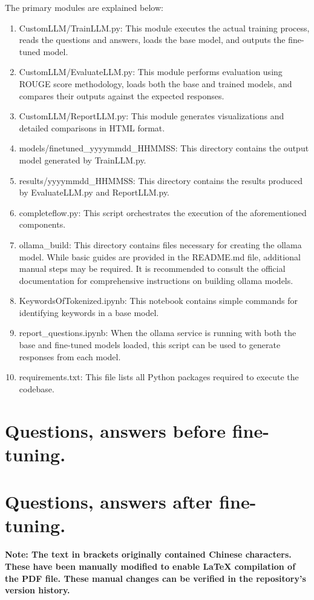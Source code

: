 \documentclass{cpsc202}
\begin{document}
    The primary modules are explained below:
    \begin{enumerate}
        \item CustomLLM/TrainLLM.py: This module executes the actual training process, reads the questions and answers, loads the base model, and outputs the fine-tuned model.
        \item CustomLLM/EvaluateLLM.py: This module performs evaluation using ROUGE score methodology, loads both the base and trained models, and compares their outputs against the expected responses.
        \item CustomLLM/ReportLLM.py: This module generates visualizations and detailed comparisons in HTML format.
        \item models/finetuned\_yyyymmdd\_HHMMSS: This directory contains the output model generated by TrainLLM.py.
        \item results/yyyymmdd\_HHMMSS: This directory contains the results produced by EvaluateLLM.py and ReportLLM.py.
        \item completeflow.py: This script orchestrates the execution of the aforementioned components.
        \item ollama\_build: This directory contains files necessary for creating the ollama model. While basic guides are provided in the README.md file, additional manual steps may be required. It is recommended to consult the official documentation for comprehensive instructions on building ollama models.
        \item KeywordsOfTokenized.ipynb: This notebook contains simple commands for identifying keywords in a base model.
        \item report\_questions.ipynb: When the ollama service is running with both the base and fine-tuned models loaded, this script can be used to generate responses from each model.
        \item requirements.txt: This file lists all Python packages required to execute the codebase.
    \end{enumerate}
    \newpage
    \section{Questions, answers before fine-tuning.}
    
    \section{Questions, answers after fine-tuning.}
    \textbf{Note: The text in brackets originally contained Chinese characters. These have been manually modified to enable LaTeX compilation of the PDF file. These manual changes can be verified in the repository's version history.}
\end{document}
